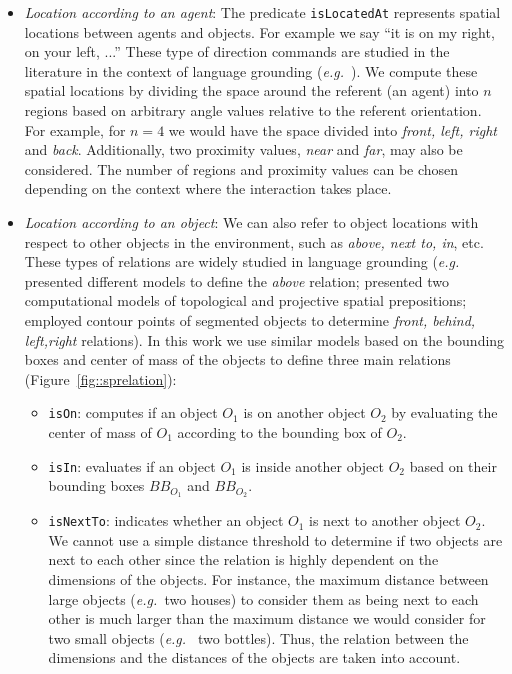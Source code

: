 \documentclass[twocolumn]{svjour3}
\newcommand{\concept}[1]{{\footnotesize \texttt{#1}}}
\newcommand{\eg}{{\textit{e.g.~}}}
\begin{document}
\begin{itemize} 

\item \emph{Location according to an agent}: The predicate
\concept{isLocatedAt} represents spatial locations between agents and objects.
For example we say ``it is on my right, on your left, ...'' These type of direction commands are studied
in the literature in the context of language grounding (\eg \cite{OKeefe1999,Matuszek10}). We compute these
spatial locations by dividing the space around the referent (an agent) into $n$
regions based on arbitrary angle values relative to the referent orientation.
For example, for $n = 4$ we would have the space divided into \emph{front,
left, right} and \emph{back}. Additionally, two proximity values, \emph{near}
and \emph{far}, may also be considered. The number of regions and proximity
values can be chosen depending on the context where the interaction takes
place.

\item \emph{Location according to an object}: We can also refer to object
locations with respect to other objects in the environment, such as \emph{above,
next to, in}, etc. These types of relations are widely studied in language
grounding (\eg \cite{Regier01} presented different models to define the
\emph{above} relation; \cite{Kelleher09} presented two computational models of topological and projective spatial prepositions; \cite{Blisard05} employed contour points of segmented objects to determine \emph{front, behind, left,right} relations). In this work we use similar models based on the
bounding boxes and center of mass of the objects to define three main relations
(Figure~\ref{fig::sprelation}): 

\begin{itemize}
	\item \concept{isOn}: computes if an object $O_1$ is on another object $O_2$ by
	evaluating the center of mass of $O_1$ according to the bounding box of $O_2$.

	\item \concept{isIn}: evaluates if an object $O_1$ is inside another object
	$O_2$ based on their bounding boxes $BB_{O_1}$ and $BB_{O_2}$.

	\item \concept{isNextTo}: indicates whether an object $O_1$ is next to another
	object $O_2$. We cannot use a simple distance threshold to determine if two
	objects are next to each other since the relation is highly dependent on the
	dimensions of the objects. For instance, the maximum distance between large
	objects (\eg two houses) to consider them as being next to each other is much
	larger than the maximum distance we would consider for two small objects (\eg
	two bottles). Thus, the relation between the dimensions and the distances of
	the objects are taken into account.  


\end{itemize}
\end{itemize}
\end{document}
